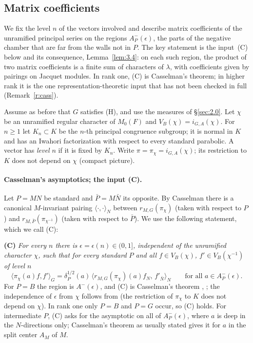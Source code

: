 \documentclass[12pt,letterpaper]{article}
\numberwithin{equation}{section}
\theoremstyle{plain}
\theoremstyle{remark}
\theoremstyle{plain}
\theoremstyle{definition}
\theoremstyle{remark}
\theoremstyle{remark}
\newcommand{\ip}[1]{\langle #1\rangle}
\begin{document}
\subsection{Matrix coefficients}\label{sec:3.1}

We fix the level $n$ of the vectors involved and describe matrix coefficients of the unramified principal series on the regions $A^-_P(\epsilon)$, the parts of the negative chamber that are far from the walls not in $P$. The key statement is the input~(C) below and its consequence, Lemma~\ref{lem:3.4}: on each such region, the product of two matrix coefficients is a finite sum of characters of $\lambda$, with coefficients given by pairings on Jacquet modules. In rank one, (C) is Casselman's theorem; in higher rank it is the one representation-theoretic input that has not been checked in full (Remark~\ref{r:cass}).


Assume as before that $G$ satisfies (H), and use the measures of \S\ref{sec:2.0}. Let $\chi$ be an unramified regular character of $M_0(F)$ and $V_B(\chi)=i_{G,A}(\chi)$. For $n\ge1$ let $K_n\subset K$ be the $n$-th principal congruence subgroup; it is normal in $K$ and has an Iwahori factorization with respect to every standard parabolic. A vector has \emph{level $n$} if it is fixed by $K_n$. Write $\pi=\pi_\chi=i_{G,A}(\chi)$; its restriction to $K$ does not depend on $\chi$ (compact picture).

\paragraph{Casselman's asymptotics; the input (C).} Let $P=MN$ be standard and $\bar P=M\bar N$ its opposite. By Casselman \cite[\S4]{Ca95} there is a canonical $M$-invariant pairing $\ip{\cdot,\cdot}_N$ between $r_{M,G}(\pi_\chi)$ (taken with respect to $P$) and $r_{M,\bar P}(\pi_{\chi^{-1}})$ (taken with respect to $\bar P$). We use the following statement, which we call (C):

\smallskip\noindent\textbf{(C)} \emph{For every $n$ there is $\epsilon=\epsilon(n)\in(0,1]$, independent of the unramified character $\chi$, such that for every standard $P$ and all $f\in V_B(\chi)$, $f'\in V_B(\chi^{-1})$ of level $n$}
\begin{equation}\label{eq:3.1}
\ip{\pi_\chi(a)f,f'}_G=\delta_P^{1/2}(a)\,\ip{r_{M,G}(\pi_\chi)(a)f_N,\,f'_{\bar N}}_N\qquad\text{for all }a\in A^-_P(\epsilon).
\end{equation}
For $P=B$ the region is $A^-(\epsilon)$, and (C) is Casselman's theorem \cite[Prop.~4.3.3]{Ca95}, \cite{Ca80}; the independence of $\epsilon$ from $\chi$ follows from \cite[\S3]{Ca79} (the restriction of $\pi_\chi$ to $K$ does not depend on $\chi$). In rank one only $P=B$ and $P=G$ occur, so (C) holds. For intermediate $P$, (C) asks for the asymptotic on all of $A^-_P(\epsilon)$, where $a$ is deep in the $N$-directions only; Casselman's theorem as usually stated gives it for $a$ in the split center $A_M$ of $M$.
\end{document}
